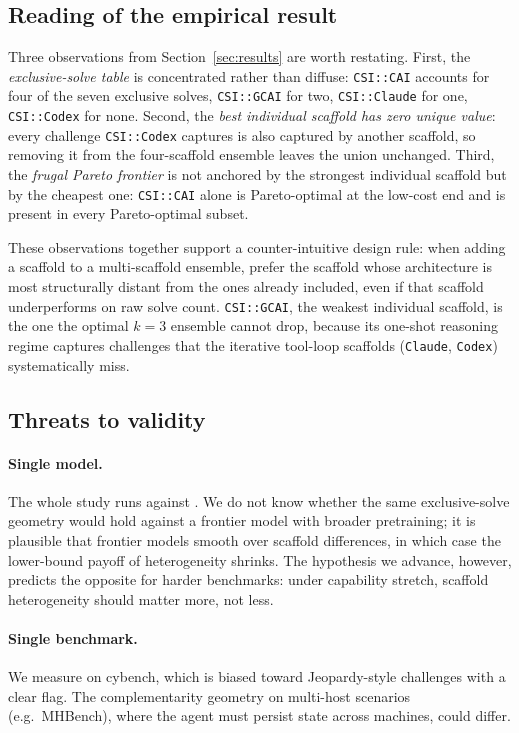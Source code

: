 \subsection{Reading of the empirical result}\label{sec:reading}

Three observations from Section~\ref{sec:results} are worth restating. First, the \emph{exclusive-solve table} is concentrated rather than diffuse: \texttt{CSI::CAI} accounts for four of the seven exclusive solves, \texttt{CSI::GCAI} for two, \texttt{CSI::Claude} for one, \texttt{CSI::Codex} for none. Second, the \emph{best individual scaffold has zero unique value}: every challenge \texttt{CSI::Codex} captures is also captured by another scaffold, so removing it from the four-scaffold ensemble leaves the union unchanged. Third, the \emph{frugal Pareto frontier} is not anchored by the strongest individual scaffold but by the cheapest one: \texttt{CSI::CAI} alone is Pareto-optimal at the low-cost end and is present in every Pareto-optimal subset.

These observations together support a counter-intuitive design rule: when adding a scaffold to a multi-scaffold ensemble, prefer the scaffold whose architecture is most structurally distant from the ones already included, even if that scaffold underperforms on raw solve count. \texttt{CSI::GCAI}, the weakest individual scaffold, is the one the optimal $k=3$ ensemble cannot drop, because its one-shot reasoning regime captures challenges that the iterative tool-loop scaffolds (\texttt{Claude}, \texttt{Codex}) systematically miss.

\subsection{Threats to validity}\label{sec:threats}

\paragraph{Single model.} The whole study runs against \aliasmini{}. We do not know whether the same exclusive-solve geometry would hold against a frontier model with broader pretraining; it is plausible that frontier models smooth over scaffold differences, in which case the lower-bound payoff of heterogeneity shrinks. The hypothesis we advance, however, predicts the opposite for harder benchmarks: under capability stretch, scaffold heterogeneity should matter more, not less.

\paragraph{Single benchmark.} We measure on cybench, which is biased toward Jeopardy-style challenges with a clear flag. The complementarity geometry on multi-host scenarios (e.g.\ MHBench), where the agent must persist state across machines, could differ.

